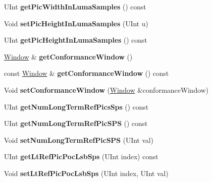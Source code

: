 \begin{DoxyCompactItemize}
U\+Int {\bfseries get\+Pic\+Width\+In\+Luma\+Samples} () const
\item 
\mbox{\label{class_t_com_s_p_s_a3f3f274cebbbb3a21656428ee1961612}} 
Void {\bfseries set\+Pic\+Height\+In\+Luma\+Samples} (U\+Int u)
\item 
\mbox{\label{class_t_com_s_p_s_a5475b9e3101ef9c9080ad2cf05e1d7af}} 
U\+Int {\bfseries get\+Pic\+Height\+In\+Luma\+Samples} () const
\item 
\mbox{\label{class_t_com_s_p_s_a598a9a6437edcdbda1f964e75c587e2d}} 
\hyperlink{class_window}{Window} \& {\bfseries get\+Conformance\+Window} ()
\item 
\mbox{\label{class_t_com_s_p_s_a11879bb84e3002bcb7f8bf438e2bee5d}} 
const \hyperlink{class_window}{Window} \& {\bfseries get\+Conformance\+Window} () const
\item 
\mbox{\label{class_t_com_s_p_s_a6303ede4f790dde4e49e7b07bb9b96cb}} 
Void {\bfseries set\+Conformance\+Window} (\hyperlink{class_window}{Window} \&conformance\+Window)
\item 
\mbox{\label{class_t_com_s_p_s_a96cb4abc3f49c5d1371af18f9f56a005}} 
U\+Int {\bfseries get\+Num\+Long\+Term\+Ref\+Pics\+Sps} () const
\item 
\mbox{\label{class_t_com_s_p_s_ac2ca208bf6e07ad9e14ae773dc53f35b}} 
U\+Int {\bfseries get\+Num\+Long\+Term\+Ref\+Pic\+S\+PS} () const
\item 
\mbox{\label{class_t_com_s_p_s_ac167f5a31c4bff533608930b977a981d}} 
Void {\bfseries set\+Num\+Long\+Term\+Ref\+Pic\+S\+PS} (U\+Int val)
\item 
\mbox{\label{class_t_com_s_p_s_ad47e31f4e505552116a650b843c53f8e}} 
U\+Int {\bfseries get\+Lt\+Ref\+Pic\+Poc\+Lsb\+Sps} (U\+Int index) const
\item 
\mbox{\label{class_t_com_s_p_s_aa90e66f0e215108527bd952c6ee1019c}} 
Void {\bfseries set\+Lt\+Ref\+Pic\+Poc\+Lsb\+Sps} (U\+Int index, U\+Int val)

\end{DoxyCompactItemize}
